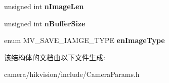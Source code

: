 \begin{DoxyCompactItemize}
\mbox{\label{struct___m_v___s_a_v_e___i_m_a_g_e___p_a_r_a_m___t___af60f24498c48032e6ea3a4da5dca0a46}} 
unsigned int {\bfseries n\+Image\+Len}
\item 
\mbox{\label{struct___m_v___s_a_v_e___i_m_a_g_e___p_a_r_a_m___t___adfc1b89e2aeed248df8c0000c887f436}} 
unsigned int {\bfseries n\+Buffer\+Size}
\item 
\mbox{\label{struct___m_v___s_a_v_e___i_m_a_g_e___p_a_r_a_m___t___a0899dd6c4bf80d70c00ec96ce48037b6}} 
enum M\+V\+\_\+\+S\+A\+V\+E\+\_\+\+I\+A\+M\+G\+E\+\_\+\+T\+Y\+PE {\bfseries en\+Image\+Type}
\end{DoxyCompactItemize}


该结构体的文档由以下文件生成\+:\begin{DoxyCompactItemize}
\item 
camera/hikvision/include/Camera\+Params.\+h\end{DoxyCompactItemize}

